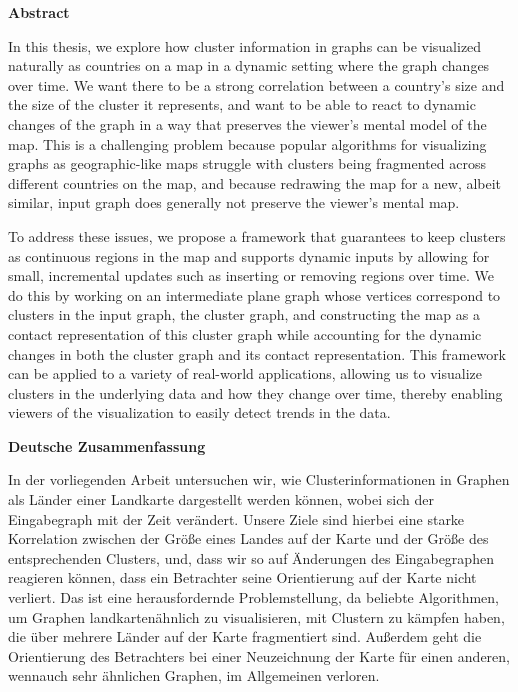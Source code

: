 \begin{addmargin}{0.5cm}

\centerline{\textbf{Abstract}}

In this thesis, we explore how cluster information in graphs can be visualized naturally as countries on a map in a dynamic setting where the graph changes over time.
We want there to be a strong correlation between a country's size and the size of the cluster it represents, and want to be able to react to dynamic changes of the graph in a way that preserves the viewer's mental model of the map.
This is a challenging problem because popular algorithms for visualizing graphs as geographic-like maps struggle with clusters being fragmented across different countries on the map, and because redrawing the map for a new, albeit similar, input graph does generally not preserve the viewer's mental map.

To address these issues, we propose a framework that guarantees to keep clusters as continuous regions in the map and supports dynamic inputs by allowing for small, incremental updates such as inserting or removing regions over time.
We do this by working on an intermediate plane graph whose vertices correspond to clusters in the input graph, the cluster graph, and constructing the map as a contact representation of this cluster graph while accounting for the dynamic changes in both the cluster graph and its contact representation.
This framework can be applied to a variety of real-world applications, allowing us to visualize clusters in the underlying data and how they change over time, thereby enabling viewers of the visualization to easily detect trends in the data.

\vskip 2cm

\centerline{\textbf{Deutsche Zusammenfassung}}

In der vorliegenden Arbeit untersuchen wir, wie Clusterinformationen in Graphen als Länder einer Landkarte dargestellt werden können, wobei sich der Eingabegraph mit der Zeit verändert.
Unsere Ziele sind hierbei eine starke Korrelation zwischen der Größe eines Landes auf der Karte und der Größe des entsprechenden Clusters, und, dass wir so auf Änderungen des Eingabegraphen reagieren können, dass ein Betrachter seine Orientierung auf der Karte nicht verliert.
Das ist eine herausfordernde Problemstellung, da beliebte Algorithmen, um Graphen landkartenähnlich zu visualisieren, mit Clustern zu kämpfen haben, die über mehrere Länder auf der Karte fragmentiert sind.
Außerdem geht die Orientierung des Betrachters bei einer Neuzeichnung der Karte für einen anderen, wennauch sehr ähnlichen Graphen, im Allgemeinen verloren.


\end{addmargin}
